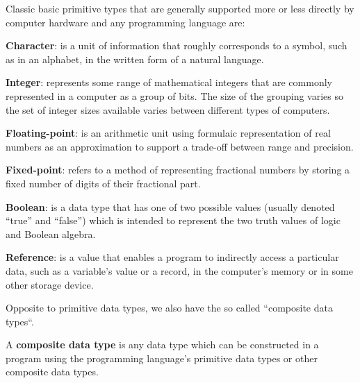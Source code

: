 \be
Classic basic primitive types that are generally supported more or less directly by computer hardware and any
programming language are:
\bit
\item \textbf{Character}: is a unit of information that roughly corresponds to a symbol, such as in an alphabet, in the
written form of a natural language.
\item \textbf{Integer}: represents some range of mathematical integers that are commonly represented in a computer as
a group of bits. The size of the grouping varies so the set of integer sizes available varies between different types
of computers.
\item \textbf{Floating-point}: is an arithmetic unit using formulaic representation of real numbers as an approximation
to support a trade-off between range and precision.
\item \textbf{Fixed-point}: refers to a method of representing fractional numbers by storing a fixed number of digits of
their fractional part.
\item \textbf{Boolean}: is a data type that has one of two possible values (usually denoted ``true'' and ``false'')
which is intended to represent the two truth values of logic and Boolean algebra.
\item \textbf{Reference}: is a value that enables a program to indirectly access a particular data, such as a variable's
value or a record, in the computer's memory or in some other storage device.
\eit
\ee

Opposite to primitive data types, we also have the so called ``composite data types``.

A \textbf{composite data type} is any data type which can be constructed in a program using the programming
language's primitive data types or other composite data types.
\ed